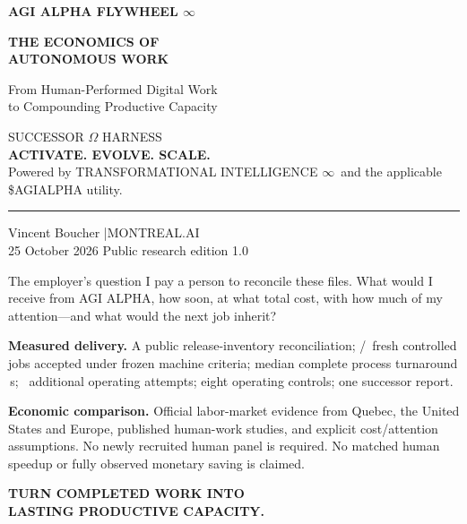 \documentclass[11pt,a4paper]{article}
\newcommand{\Alpha}{AGI ALPHA}
\newcommand{\OmegaHarness}{SUCCESSOR $\Omega$ HARNESS}
\newcommand{\TI}{TRANSFORMATIONAL INTELLIGENCE $\infty$}
\begin{document}
\begin{titlepage}
\color{ink}
\vspace*{6mm}
{\Large\bfseries\color{purple} AGI ALPHA FLYWHEEL \hfill $\infty$}\par
\vspace{15mm}
{\fontsize{30}{38}\selectfont\bfseries THE ECONOMICS OF\\[3pt]AUTONOMOUS WORK\par}
\vspace{6mm}
{\Large From Human-Performed Digital Work\\[2pt]to Compounding Productive Capacity\par}
\vspace{10mm}
{\large\color{purple}\OmegaHarness}\\[2mm]
{\large\bfseries ACTIVATE. EVOLVE. SCALE.}\\[2mm]
{\small Powered by \TI\ and the applicable \$AGIALPHA utility.}\par
\vspace{9mm}
{\color{gold}\rule{\textwidth}{.8pt}}
\vspace{4mm}
{\large Vincent Boucher \quad|\quad MONTREAL.AI}\\
25 October 2026 \quad Public research edition 1.0\par
\vspace{6mm}
\begin{evidencebox}{The employer's question}
I pay a person to reconcile these files. What would I receive from \Alpha, how soon, at what total cost, with how much of my attention---and what would the next job inherit?
\end{evidencebox}
\vspace{4mm}
\textbf{Measured delivery.} A public release-inventory reconciliation; \PrimaryAccepted/\PrimaryN\ fresh controlled jobs accepted under frozen machine criteria; median complete process turnaround \MedianWall\,s; \ScaleAccepted\ additional operating attempts; eight operating controls; one successor report.\par
\textbf{Economic comparison.} Official labor-market evidence from Quebec, the United States and Europe, published human-work studies, and explicit cost/attention assumptions. No newly recruited human panel is required. No matched human speedup or fully observed monetary saving is claimed.\par
\vfill
{\Large\bfseries\color{purple} TURN COMPLETED WORK INTO\\[2pt]LASTING PRODUCTIVE CAPACITY.\par}
\vspace{5mm}
\end{titlepage}
\end{document}
